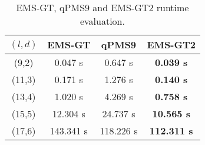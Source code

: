 \begin{table}[h]
	\renewcommand{\arraystretch}{1.3}
	\centering
	\begin{tabular}{|c|c|c|c|}
	\hline 
	\bfseries\boldmath $(l,d)$ & 
	\bfseries EMS-GT & 
	\bfseries qPMS9 & 
	\bfseries\boldmath EMS-GT2 \\
	\hline
	 (9,2) &   0.047 s & 	0.647 s &    \textbf{0.039 s} \\
	(11,3) &   0.171 s &	1.276 s &    \textbf{0.140 s} \\
	(13,4) &   1.020 s &	4.269 s &    \textbf{0.758 s} \\
	(15,5) &  12.304 s &	24.737 s &   \textbf{10.565 s} \\
	(17,6) & 143.341 s &	118.226 s &  \textbf{112.311 s} \\
	\hline\end{tabular}
	
	\caption{EMS-GT, qPMS9 and EMS-GT2 runtime evaluation.}
	\label{tbl:final-results-all}
\end{table}


